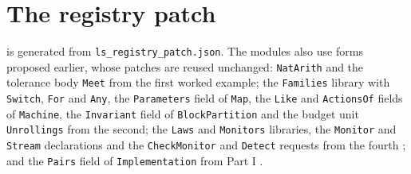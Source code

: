 \documentclass[11pt]{article}
\newcommand{\fpath}[1]{\nolinkurl{#1}}
\newcommand{\code}[1]{\texttt{#1}}
\theoremstyle{definition}
\theoremstyle{plain}
\begin{document}
\section{The registry patch}\label{app:registry}

 is generated from \fpath{ls_registry_patch.json}. The modules also use forms
proposed earlier, whose patches are reused unchanged: \code{NatArith} and the tolerance body
\code{Meet} from the first worked example; the \code{Families} library with \code{Switch},
\code{For} and \code{Any}, the \code{Parameters} field of \code{Map}, the \code{Like} and
\code{ActionsOf} fields of \code{Machine}, the \code{Invariant} field of \code{BlockPartition} and
the budget unit \code{Unrollings} from the second; the \code{Laws} and \code{Monitors} libraries,
the \code{Monitor} and \code{Stream} declarations and the \code{CheckMonitor} and \code{Detect}
requests from the fourth \cite[Appendix~B]{worked}; and the \code{Pairs} field of
\code{Implementation} from Part I \cite[Appendix~B]{part1}.
\end{document}
